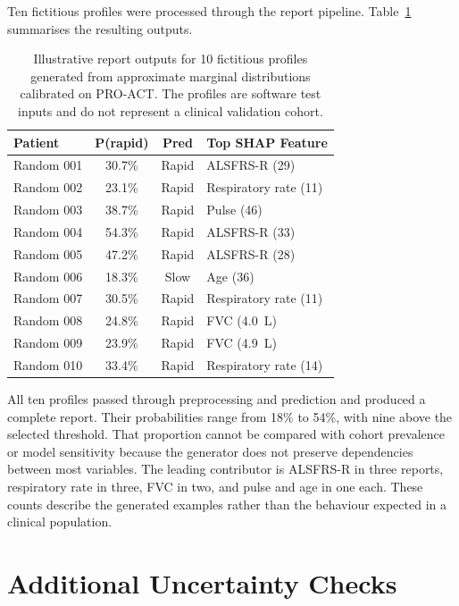 Ten fictitious profiles were processed through the report pipeline. Table~\ref{tab:synthetic_patient_reports} summarises the resulting outputs.

\begin{table}[ht!]
\centering
\caption[Reports for 10 fictitious profiles]{Illustrative report outputs for 10 fictitious profiles generated from approximate marginal distributions calibrated on PRO-ACT. The profiles are software test inputs and do not represent a clinical validation cohort.}
\label{tab:synthetic_patient_reports}
\small
\begin{tabular}{lccl}
\toprule
Patient & P(rapid) & Pred & Top SHAP Feature \\
\midrule
Random 001 & 30.7\% & Rapid & ALSFRS-R (29) \\
Random 002 & 23.1\% & Rapid & Respiratory rate (11) \\
Random 003 & 38.7\% & Rapid & Pulse (46) \\
Random 004 & 54.3\% & Rapid & ALSFRS-R (33) \\
Random 005 & 47.2\% & Rapid & ALSFRS-R (28) \\
Random 006 & 18.3\% & Slow  & Age (36) \\
Random 007 & 30.5\% & Rapid & Respiratory rate (11) \\
Random 008 & 24.8\% & Rapid & FVC (4.0~L) \\
Random 009 & 23.9\% & Rapid & FVC (4.9~L) \\
Random 010 & 33.4\% & Rapid & Respiratory rate (14) \\
\bottomrule
\end{tabular}
\end{table}

All ten profiles passed through preprocessing and prediction and produced a complete report. Their probabilities range from 18\% to 54\%, with nine above the selected threshold. That proportion cannot be compared with cohort prevalence or model sensitivity because the generator does not preserve dependencies between most variables. The leading contributor is \gls{ALSFRS-R} in three reports, respiratory rate in three, \gls{FVC} in two, and pulse and age in one each. These counts describe the generated examples rather than the behaviour expected in a clinical population.

\section{Additional Uncertainty Checks}
\label{app:review_s1_uncertainty}

